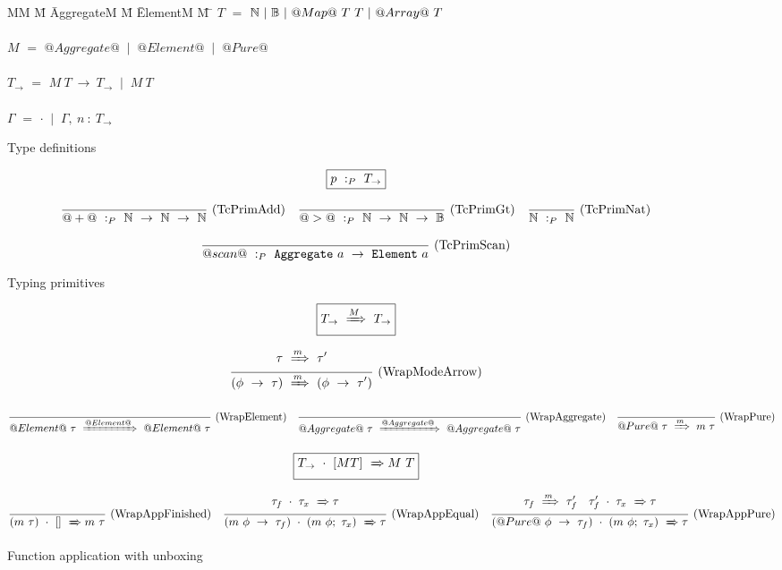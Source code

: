 
\begin{figure}

\begin{tabbing}
MM \= M \= AggregateM \= M \= ElementM \= M \= \kill
$T$
    \> $=$  \> $\mathbb{N}~|~\mathbb{B}~|~@Map@~T~T~|~@Array@~T$ \\
\\
$M$
    \> $=$  \> $@Aggregate@$ \> $~|~$ \> $@Element@$ \> $~|~$ \> $@Pure@$         \\
\\
$T_{\to}$
    \> $=$  
            \> $M~T~\to~T_{\to}$
            \> $~|~$
            \> $M~T$ \\
\\
$\Gamma$
    \> $=$  
            \> $\cdot$
            \> $~|~$
            \> $\Gamma,~n~:~T_\to$ \\
\end{tabbing}

\caption{Type definitions}
\label{fig:source:type:defs}
\end{figure}


\begin{figure*}

$$
\boxed{p ~:_{P}~ T_\to}
$$


$$
\frac {\displaystyle 
} {\displaystyle  
    @+@ ~:_{P}~ \mathbb{N}~\to~\mathbb{N}~\to~\mathbb{N}
} \ 
\textrm{(TcPrimAdd)}
\quad
\frac {\displaystyle 
} {\displaystyle 
    @>@ ~:_{P}~ \mathbb{N}~\to~\mathbb{N}~\to~\mathbb{B}
} \ 
\textrm{(TcPrimGt)}
\quad
\frac {\displaystyle 
} {\displaystyle  
    \mathbb{N} ~:_{P}~ \mathbb{N}
} \ 
\textrm{(TcPrimNat)}
$$

$$
\frac {\displaystyle 
} {\displaystyle  
    @scan@ ~:_{P}~ \mathtt{Aggregate}~a~\to~\mathtt{Element}~a
} \ 
\textrm{(TcPrimScan)}
$$

\caption{Typing primitives}
\label{fig:source:type:prim}
\end{figure*}


\begin{figure*}

$$
\boxed{T_{\to} ~\xRightarrow{M}~ T_{\to}}
$$

$$
\frac {\displaystyle 
    \tau ~\xRightarrow{m}~ \tau'
} {\displaystyle 
    (\phi~\to~\tau) ~\xRightarrow{m}~ (\phi~\to~\tau')
} \ 
\textrm{(WrapModeArrow)}
$$

$$
\frac {\displaystyle  } {\displaystyle 
    @Element@~\tau ~\xRightarrow{@Element@}~ @Element@~\tau
} \ 
\textrm{(WrapElement)}
\quad
\frac {\displaystyle  } {\displaystyle 
    @Aggregate@~\tau ~\xRightarrow{@Aggregate@}~ @Aggregate@~\tau
} \ 
\textrm{(WrapAggregate)}
\quad
\frac {\displaystyle  } {\displaystyle 
    @Pure@~\tau ~\xRightarrow{m}~ m~\tau
} \ 
\textrm{(WrapPure)}
$$


$$
\boxed{T_{\to}~\cdot~[M T] ~\xRightarrow~ M~T}
$$

$$
\frac {\displaystyle 
} {\displaystyle 
    (m~\tau)~\cdot~[] ~\xRightarrow~ m~\tau
} \ 
\textrm{(WrapAppFinished)}
\quad
\frac {\displaystyle 
    \tau_f~\cdot~\tau_x ~\xRightarrow~ \tau
} {\displaystyle 
    (m~\phi~\to~\tau_f)~\cdot~(m~\phi;~\tau_x) ~\xRightarrow~ \tau
} \ 
\textrm{(WrapAppEqual)}
\quad
\frac {\displaystyle 
    \tau_f ~\xRightarrow{m}~ \tau_f'
    \quad
    \tau_f'~\cdot~\tau_x ~\xRightarrow~ \tau
} {\displaystyle 
    (@Pure@~\phi~\to~\tau_f)~\cdot~(m~\phi;~\tau_x) ~\xRightarrow~ \tau
} \ 
\textrm{(WrapAppPure)}
$$

\caption{Function application with unboxing}
\label{fig:source:type:wrap}
\end{figure*}

